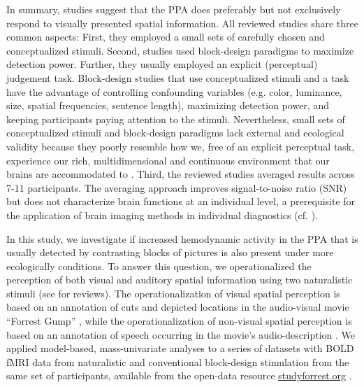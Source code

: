 \documentclass[english]{article}
\begin{document}
In summary, studies suggest that the PPA does preferably but not exclusively
respond to visually presented spatial information.
All reviewed studies share three common aspects:
First, they employed a small sets of carefully chosen and conceptualized
stimuli.
Second, studies used block-design paradigms to maximize detection power.
Further, they usually employed an explicit (perceptual) judgement task.
Block-design studies that use conceptualized stimuli and a task have the
advantage of controlling confounding variables (e.g. color, luminance, size,
spatial frequencies, sentence length), maximizing detection power, and keeping
participants paying attention to the stimuli.
Nevertheless, small sets of conceptualized stimuli and block-design paradigms
lack external and ecological validity \citep{westfall2016fixing,
hasson2004intersubject} because they poorly resemble how we, free of an
explicit perceptual task, experience our rich, multidimensional and continuous
environment that our brains are accommodated to
\citep{sonkusare2019naturalistic}.
Third, the reviewed studies averaged results across 7-11 participants.
The averaging approach improves signal-to-noise ratio (SNR) but does not
characterize brain functions at an individual level, a prerequisite for the
application of brain imaging methods in individual diagnostics (cf.
\cite{dubois2016building, eickhoff2020towards}).

In this study, we investigate if increased hemodynamic activity in the PPA that
is usually detected by contrasting blocks of pictures is also present under
more ecologically conditions.
To answer this question, we operationalized the perception of both visual and
auditory spatial information using two naturalistic stimuli (see
\citep{hamilton2018revolution, hasson2008neurocinematics,
sonkusare2019naturalistic} for reviews).
The operationalization of visual spatial perception is based on an annotation of
cuts and depicted locations in the audio-visual movie ``Forrest Gump''
\citep{haeusler2016cutanno}, while
the operationalization of non-visual spatial perception is based on an
annotation of speech occurring in the movie's audio-description
\citep{hausler2021studyforrest}.
We applied model-based, mass-univariate analyses to a series of
datasets with BOLD fMRI data from naturalistic and conventional block-design
stimulation from the same set of participants, available from the open-data
resource \href{http://www.studyforrest.org}{studyforrest.org}
\citep{hanke2016simultaneous, hanke2014audiomovie, sengupta2016extension}.
\end{document}
